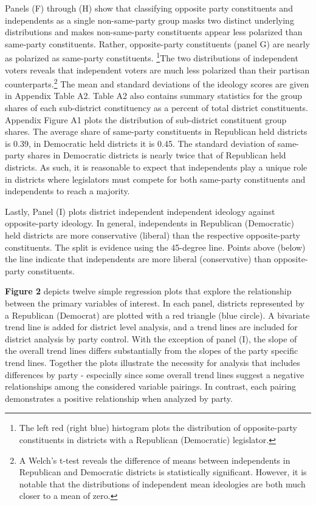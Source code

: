 \documentclass[10pt,letterpaper]{article}
\begin{document}
Panels (F) through (H) show that classifying opposite party constituents and independents as a single non-same-party group masks two distinct underlying distributions and makes non-same-party constituents appear less polarized than same-party constituents. Rather, opposite-party constituents (panel G) are nearly as polarized as same-party constituents. \footnote{The left red (right blue) histogram plots the distribution of opposite-party constituents in districts with a Republican (Democratic) legislator.}The two distributions of independent voters reveals that independent voters are much less polarized than their partisan counterparts.\footnote{A Welch's t-test reveals the difference of means between independents in Republican and Democratic districts is statistically significant. However, it is notable that the distributions of independent mean ideologies are both much closer to a mean of zero.} The mean and standard deviations of the ideology scores are given in Appendix Table A2. Table A2 also contains summary statistics for the group shares of each sub-district constituency as a percent of total district constituents. Appendix Figure A1 plots the distribution of sub-district constituent group shares. The average share of same-party constituents in Republican held districts is 0.39, in Democratic held districts it is 0.45. The standard deviation of same-party shares in Democratic districts is nearly twice that of Republican held districts. As such, it is reasonable to expect that independents play a unique role in districts where legislators must compete for both same-party constituents and independents to reach a majority.

Lastly, Panel (I) plots district independent independent ideology against opposite-party ideology. In general, independents in Republican (Democratic) held districts are more conservative (liberal) than the respective opposite-party constituents. The split is evidence using the 45-degree line. Points above (below) the line indicate that independents are more liberal (conservative) than opposite-party constituents.

\textbf{Figure 2} depicts twelve simple regression plots that explore the relationship between the primary variables of interest. In each panel, districts represented by a Republican (Democrat) are plotted with a red triangle (blue circle). A bivariate trend line is added for district level analysis, and a trend lines are included for district analysis by party control. With the exception of panel (I), the slope of the overall trend lines differs substantially from the slopes of the party specific trend lines. Together the plots illustrate the necessity for analysis that includes differences by party - especially since some overall trend lines suggest a negative relationships among the considered variable pairings. In contrast, each pairing demonstrates a positive relationship when analyzed by party.
\end{document}
